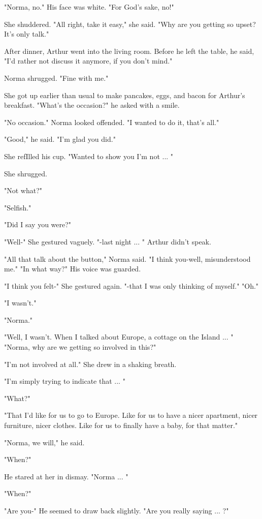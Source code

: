 \documentclass[10pt,a4paper]{book}
\begin{document}
"Norma, no." His face was white. "For God's sake, no!"

She shuddered. "All right, take it easy," she said. "Why are you getting so upset? It's only talk."

After dinner, Arthur went into the living room. Before he left the table, he said, "I'd rather not discuss it anymore, if you don't mind."

Norma shrugged. "Fine with me."

She got up earlier than usual to make pancakes, eggs, and bacon for Arthur's breakfast. "What's the occasion?" he asked with a smile.

"No occasion." Norma looked offended. "I wanted to do it, that's all."

"Good," he said. "I'm glad you did."

She refIlled his cup. "Wanted to show you I'm not ... "



She shrugged.

"Not what?"

"Selfish."

"Did I say you were?"

"Well-" She gestured vaguely. "-last night ... " Arthur didn't speak.

"All that talk about the button," Norma said. "I think you-well, misunderstood me." "In what way?" His voice was guarded.

"I think you felt-" She gestured again. "-that I was only thinking of myself." "Oh."

"I wasn't."

"Norma."

"Well, I wasn't. When I talked about Europe, a cottage on the Island ... " "Norma, why are we getting so involved in this?"

"I'm not involved at all." She drew in a shaking breath.

"I'm simply trying to indicate that ... "

"What?"

"That I'd like for us to go to Europe. Like for us to have a nicer apartment, nicer furniture, nicer clothes. Like for us to finally have a baby, for that matter."

"Norma, we will," he said.

"When?"

He stared at her in dismay. "Norma ... "

"When?"

"Are you-" He seemed to draw back slightly. "Are you really saying ... ?"
\end{document}
